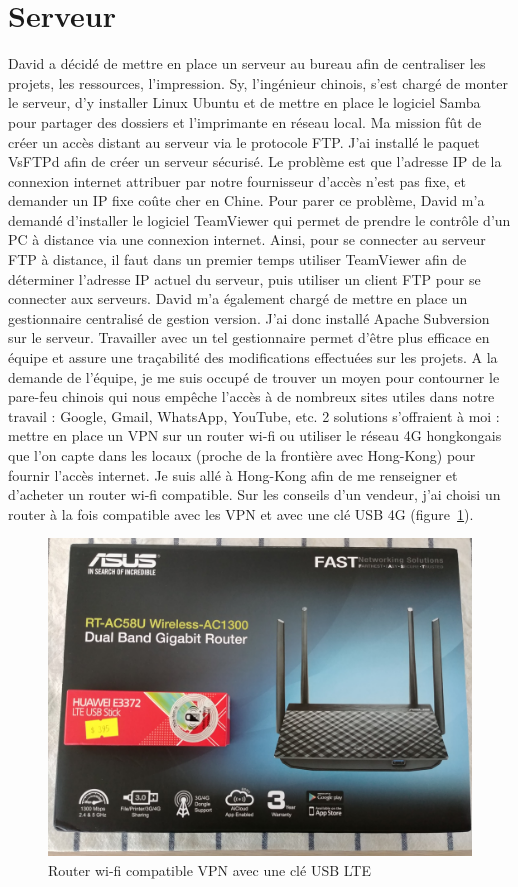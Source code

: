 \documentclass[a4paper, 12pt]{report}
\begin{document}
\section{Serveur}
David a décidé de mettre en place un serveur au bureau afin de centraliser les projets, les ressources, l’impression. Sy, l’ingénieur chinois, s’est chargé de monter le serveur, d’y installer Linux Ubuntu et de mettre en place le logiciel Samba pour partager des dossiers et l’imprimante en réseau local. Ma mission fût de créer un accès distant au serveur via le protocole FTP. J’ai installé le paquet VsFTPd afin de créer un serveur sécurisé. Le problème est que l’adresse IP de la connexion internet attribuer par notre fournisseur d’accès n’est pas fixe, et demander un IP fixe coûte cher en Chine. Pour parer ce problème, David m’a demandé d’installer le logiciel TeamViewer qui permet de prendre le contrôle d’un PC à distance via une connexion internet. Ainsi, pour se connecter au serveur FTP à distance, il faut dans un premier temps utiliser TeamViewer afin de déterminer l’adresse IP actuel du serveur, puis utiliser un client FTP pour se connecter aux serveurs.
David m’a également chargé de mettre en place un gestionnaire centralisé de gestion version. J’ai donc installé Apache Subversion sur le serveur. Travailler avec un tel gestionnaire permet d’être plus efficace en équipe et assure une traçabilité des modifications effectuées sur les projets.
A la demande de l’équipe, je me suis occupé de trouver un moyen pour contourner le pare-feu chinois qui nous empêche l’accès à de nombreux sites utiles dans notre travail : Google, Gmail, WhatsApp, YouTube, etc. 2 solutions s’offraient à moi : mettre en place un VPN sur un router wi-fi ou utiliser le réseau 4G hongkongais que l’on capte dans les locaux (proche de la frontière avec Hong-Kong) pour fournir l’accès internet. Je suis allé à Hong-Kong afin de me renseigner et d’acheter un router wi-fi compatible. Sur les conseils d’un vendeur, j’ai choisi un router à la fois compatible avec les VPN et avec une clé USB 4G (figure~\ref{fig:wifi_router}).

\begin{figure}[H]
\centering
\includegraphics[scale=0.12]{figures/photos/wifi_router.jpg}
\caption{Router wi-fi compatible VPN avec une clé USB LTE}
\label{fig:wifi_router}
\end{figure}
\end{document}
